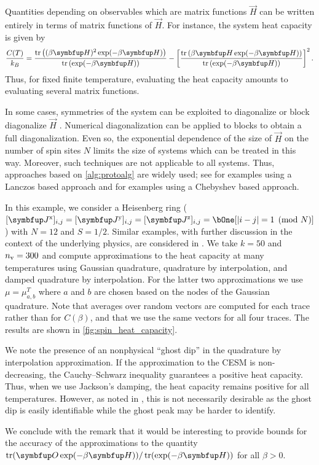 Quantities depending on observables which are matrix functions \( \vec{H} \) can be written entirely in terms of matrix functions of \( \vec{H} \).
For instance, the system heat capacity is given by
\begin{equation*}
    \frac{C(T)}{k_B}
    = 
    \frac{\tr\left( (\beta\vec{H})^2 \exp(-\beta \vec{H}) \right)}{\tr \left( \exp(-\beta \vec{H}) \right)}
    -\left[ \frac{\tr\left( \beta \vec{H} \exp(-\beta \vec{H}) \right)}{\tr \left( \exp(-\beta \vec{H}) \right)}\right]^2.
\end{equation*}
Thus, for fixed finite temperature, evaluating the heat capacity amounts to evaluating several matrix functions. 

In some cases, symmetries of the system can be exploited to diagonalize or block diagonalize \( \vec{H} \) \cite{schnalle_schnack_10}. 
Numerical diagonalization can be applied to blocks to obtain a full diagonalization.
Even so, the exponential dependence of the size of \( \vec{H} \) on the number of spin sites \( N \) limits the size of systems which can be treated in this way. 
Moreover, such techniques are not applicable to all systems. 
Thus, approaches based on \cref{alg:protoalg} are widely used; see \cite{schnack_richter_steinigeweg_20} for examples using a Lanczos based approach and \cite{schulter_gayk_schmidt_honecker_schnack_21} for examples using a Chebyshev based approach.

In this example, we consider a Heisenberg ring (\( [\vec{J}^{\textup{x}}]_{i,j} = [\vec{J}^{\textup{y}}]_{i,j} = [\vec{J}^{\textup{z}}]_{i,j} = \bOne[|i-j| = 1 \pmod{N}] \)) with \( N = 12 \) and \( S = 1/2 \).
Similar examples, with further discussion in the context of the underlying physics, are considered in \cite{schnack_richter_steinigeweg_20,schulter_gayk_schmidt_honecker_schnack_21}.
We take \( k = 50 \) and \( n_{\textup{v}} = 300 \) and compute approximations to the heat capacity at many temperatures using Gaussian quadrature, quadrature by interpolation, and damped quadrature by interpolation. 
For the latter two approximations we use \( \mu = \mu_{a,b}^T \) where \( a \) and \( b \) are chosen based on the nodes of the Gaussian quadrature. 
Note that averages over random vectors are computed for each trace rather than for \( C(\beta) \), and that we use the same vectors for all four traces. 
The results are shown in \cref{fig:spin_heat_capacity}.


We note the presence of an nonphysical ``ghost dip'' in the quadrature by interpolation approximation. 
If the approximation to the CESM is non-decreasing, the Cauchy--Schwarz inequality guarantees a positive heat capacity.
Thus, when we use Jackson's damping, the heat capacity remains positive for all temperatures.
However, as noted in \cite{schulter_gayk_schmidt_honecker_schnack_21}, this is not necessarily desirable as the ghost dip is easily identifiable while the ghost peak may be harder to identify.

We conclude with the remark that it would be interesting to provide bounds for the accuracy of the approximations to the quantity \( \tr(\vec{O} \exp(-\beta \vec{H})) / \tr(\exp(-\beta \vec{H}))  \) for all \( \beta > 0 \).


